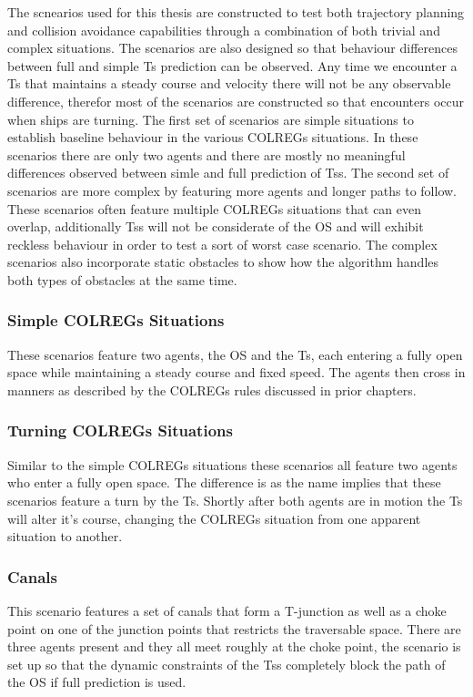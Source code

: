 \fi

The scnearios used for this thesis are constructed to test both trajectory planning and collision avoidance capabilities through
a combination of both trivial and complex situations. The scenarios are also designed so that behaviour differences between
full and simple \gls{Ts} prediction can be observed. Any time we encounter a \gls{Ts} that maintains a steady course and
velocity there will not be any observable difference, therefor most of the scenarios are constructed so that encounters occur
when ships are turning.
The first set of scenarios are simple situations to establish baseline behaviour in the various \gls{COLREGs} situations. In these scenarios there are only 
two agents and there are mostly no meaningful differences observed between simle and full prediction of \gls{Ts}s. 
The second set of scenarios are more complex by featuring more agents and longer paths to follow. These scenarios often feature multiple \gls{COLREGs} situations that can
even overlap, additionally \gls{Ts}s will not be considerate of the \gls{OS} and will exhibit reckless behaviour in order to test a sort of worst case scenario.
The complex scenarios also incorporate static obstacles to show how the algorithm handles both types of obstacles at the same time.

\subsubsection*{Simple COLREGs Situations}
These scenarios feature two agents, the \gls{OS} and the \gls{Ts}, each entering a fully open space while maintaining a
steady course and fixed speed. The agents then cross in manners as described by the \gls{COLREGs} rules discussed in prior chapters.


\subsubsection*{Turning COLREGs Situations}
Similar to the simple \gls{COLREGs} situations these scenarios all feature two agents who enter a fully open space. The difference
is as the name implies that these scenarios feature a turn by the \gls{Ts}. Shortly after both agents are in motion the \gls{Ts}
will alter it's course, changing the COLREGs situation from one apparent situation to another.

\subsubsection*{Canals}
This scenario features a set of canals that form a T-junction as well as a choke point on one of the junction points that restricts
the traversable space. There are three agents present and they all meet roughly at the choke point, the scenario is set up so that
the dynamic constraints of the \gls{Ts}s completely block the path of the \gls{OS} if full prediction is used.

